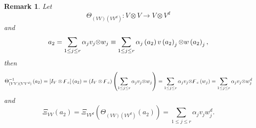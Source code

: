 \documentclass[aps,preprint]{revtex4}%
\newtheorem{remark}[theorem]{Remark}
\begin{document}
\begin{remark}
Let
\begin{equation}
\Theta_{\left(  VV\right)  \left(  VV^{d}\right)  }:V\otimes V\rightarrow
V\otimes V^{d}%
\end{equation}
and
\begin{equation}
a_{2}=\sum_{1\leq j\leq r}\alpha_{j}v_{j}{\small \otimes}w_{j}\equiv
\sum_{1\leq j\leq r}\alpha_{j}\left(  a_{2}\right)  v\left(  a_{2}\right)
_{j}{\small \otimes}w\left(  a_{2}\right)  _{j},
\end{equation}
then
\begin{equation}
\Theta_{\left(  VV\right)  \left(  VV^{d}\right)  }^{-1}\left(  a_{2}\right)
=\left[  I_{V}\otimes\digamma_{e}\right]  \left(  a_{2}\right)  =\left(
I_{V}\otimes\digamma_{e}\right)  \left(  \sum_{1\leq j\leq r}\alpha_{j}%
v_{j}{\small \otimes}w_{j}\right)  =\sum_{1\leq j\leq r}\alpha_{j}%
v_{j}{\small \otimes}\digamma_{e}\left(  w_{j}\right)  =\sum_{1\leq j\leq
r}\alpha_{j}v_{j}{\small \otimes}w_{j}^{d}%
\end{equation}
and
\begin{equation}
\Xi_{VV}\left(  a_{2}\right)  =\Xi_{VV^{d}}\left(  \Theta_{\left(  VV\right)
\left(  VV^{d}\right)  }\left(  a_{2}\right)  \right)  =\sum_{1\leq j\leq
r}\alpha_{j}v_{j}w_{j}^{d}.
\end{equation}

\end{remark}
\end{document}
